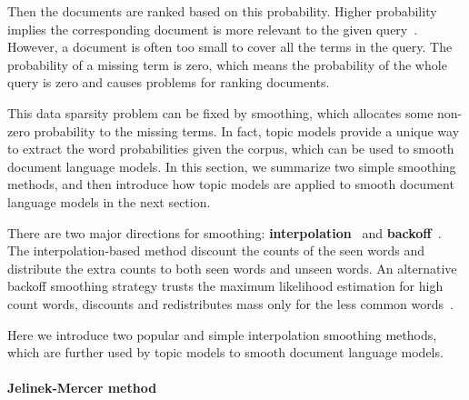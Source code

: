 Then the documents are ranked based on this probability. Higher
probability implies the corresponding document is more relevant to the
given query~\citep{song-99}. However, a document is often too small to
cover all the terms in the query. The probability of a missing term is
zero, which means the probability of the whole query is zero and
causes problems for ranking documents.

This data sparsity problem can be fixed by smoothing, which allocates
some non-zero probability to the missing terms. In fact, topic models
provide a unique way to extract the word probabilities given the
corpus, which can be used to smooth document language models.  In
this section, we summarize two simple smoothing methods, and then
introduce how topic models are applied to smooth document language
models in the next section.



There are two major directions for smoothing:
\textbf{interpolation}~\citep{Jelinek-1980,mackay95dirichlet,Ney-1994,PonteCroft,zhai-01}
and \textbf{backoff}~\citep{katz-87,song-99}. The interpolation-based
method discount the counts of the seen words and distribute the extra
counts to both seen words and unseen words. An alternative backoff
smoothing strategy trusts the maximum likelihood estimation for high
count words, discounts and redistributes mass only for the less common
words~\citep{zhai-01}.

Here we introduce two popular and simple interpolation smoothing
methods, which are further used by topic models to smooth document
language models.

\paragraph{Jelinek-Mercer method}

